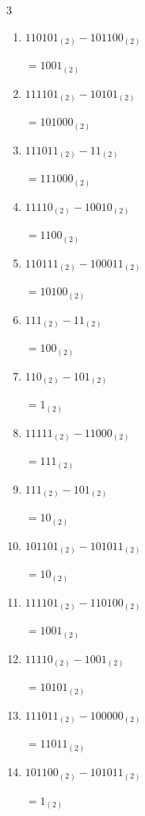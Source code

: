 \begin{multicols}{3}
\begin{enumerate}
  \item $110101_{(2)} - 101100_{(2)}$

        $=1001_{(2)}$

  \item $111101_{(2)} - 10101_{(2)}$

        $=101000_{(2)}$

  \item $111011_{(2)} - 11_{(2)}$

        $=111000_{(2)}$

  \item $11110_{(2)} - 10010_{(2)}$

        $=1100_{(2)}$

\columnbreak %

\resetques

  \item $110111_{(2)} - 100011_{(2)}$

        $=10100_{(2)}$

  \item $111_{(2)} - 11_{(2)}$

        $=100_{(2)}$

  \item $110_{(2)} - 101_{(2)}$

        $=1_{(2)}$

  \item $11111_{(2)} - 11000_{(2)}$

        $=111_{(2)}$

  \item $111_{(2)} - 101_{(2)}$

        $=10_{(2)}$

  \item $101101_{(2)} - 101011_{(2)}$

        $=10_{(2)}$

  \item $111101_{(2)} - 110100_{(2)}$

        $=1001_{(2)}$

  \item $11110_{(2)} - 1001_{(2)}$

        $=10101_{(2)}$

  \item $111011_{(2)} - 100000_{(2)}$

        $=11011_{(2)}$

  \item $101100_{(2)} - 101011_{(2)}$

        $=1_{(2)}$


\end{enumerate}
\end{multicols}
